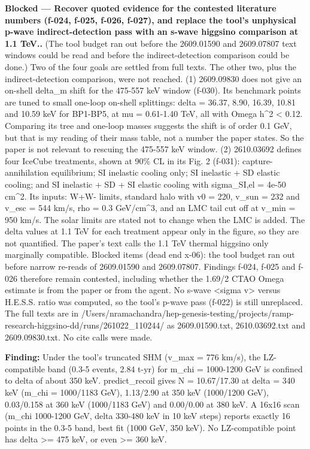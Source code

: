 \documentclass[11pt,a4paper]{article}
\begin{document}
\textbf{Blocked --- Recover quoted evidence for the contested literature numbers (f-024, f-025, f-026, f-027), and replace the tool's unphysical p-wave indirect-detection pass with an s-wave higgsino comparison at 1.1 TeV..} (The tool budget ran out before the 2609.01590 and 2609.07807 text windows could be read and before the indirect-detection comparison could be done.) Two of the four goals are settled from full texts. The other two, plus the indirect-detection comparison, were not reached. (1) 2609.09830 does not give an on-shell delta\_m shift for the 475-557 keV window (f-030). Its benchmark points are tuned to small one-loop on-shell splittings: delta = 36.37, 8.90, 16.39, 10.81 and 10.59 keV for BP1-BP5, at \textbar{}mu\textbar{} = 0.61-1.40 TeV, all with Omega h\textasciicircum{}2 \textless{} 0.12. Comparing its tree and one-loop masses suggests the shift is of order 0.1 GeV, but that is my reading of their mass table, not a number the paper states. So the paper is not relevant to rescuing the 475-557 keV window. (2) 2610.03692 defines four IceCube treatments, shown at 90\% CL in its Fig. 2 (f-031): capture-annihilation equilibrium; SI inelastic cooling only; SI inelastic + SD elastic cooling; and SI inelastic + SD + SI elastic cooling with sigma\_SI,el = 4e-50 cm\textasciicircum{}2. Its inputs: W+W- limits, standard halo with v0 = 220, v\_sun = 232 and v\_esc = 544 km/s, rho = 0.3 GeV/cm\textasciicircum{}3, and an LMC tail cut off at v\_min = 950 km/s. The solar limits are stated not to change when the LMC is added. The delta values at 1.1 TeV for each treatment appear only in the figure, so they are not quantified. The paper's text calls the 1.1 TeV thermal higgsino only marginally compatible. Blocked items (dead end x-06): the tool budget ran out before narrow re-reads of 2609.01590 and 2609.07807. Findings f-024, f-025 and f-026 therefore remain contested, including whether the 1.69/2 CTAO Omega estimate is from the paper or from the agent. No s-wave \textless{}sigma v\textgreater{} versus H.E.S.S. ratio was computed, so the tool's p-wave pass (f-022) is still unreplaced. The full texts are in /Users/nramachandra/hep-genesis-testing/projects/ramp-research-higgsino-dd/runs/261022\_110244/ as 2609.01590.txt, 2610.03692.txt and 2609.09830.txt. No cite calls were made.

\textbf{Finding:} Under the tool's truncated SHM (v\_max = 776 km/s), the LZ-compatible band (0.3-5 events, 2.84 t-yr) for m\_chi = 1000-1200 GeV is confined to delta of about 350 keV. predict\_recoil gives N = 10.67/17.30 at delta = 340 keV (m\_chi = 1000/1183 GeV), 1.13/2.90 at 350 keV (1000/1200 GeV), 0.03/0.158 at 360 keV (1000/1183 GeV) and 0.00/0.00 at 380 keV. A 16x16 scan (m\_chi 1000-1200 GeV, delta 330-480 keV in 10 keV steps) reports exactly 16 points in the 0.3-5 band, best fit (1000 GeV, 350 keV). No LZ-compatible point has delta \textgreater{}= 475 keV, or even \textgreater{}= 360 keV.
\end{document}
